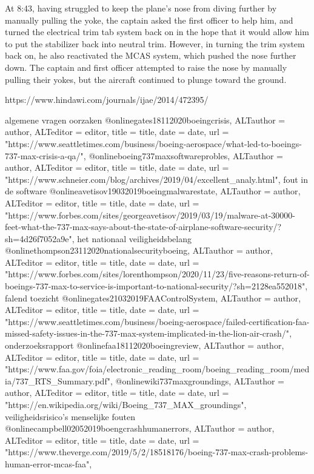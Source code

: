 {{{{{{{{{{{{{{At 8:43, having struggled to keep the plane's nose from diving further by manually pulling the yoke, the captain asked the first officer to help him, and turned the electrical trim tab system back on in the hope that it would allow him to put the stabilizer back into neutral trim. However, in turning the trim system back on, he also reactivated the MCAS system, which pushed the nose further down. The captain and first officer attempted to raise the nose by manually pulling their yokes, but the aircraft continued to plunge toward the ground.

https://www.hindawi.com/journals/ijae/2014/472395/ 
\cite{caliskan09112013747boeingkalman}

algemene vragen
oorzaken
@online{gates18112020boeingcrisis,	ALTauthor = {author},	ALTeditor = {editor},	title = {title},	date = {date},	url = {"https://www.seattletimes.com/business/boeing-aerospace/what-led-to-boeings-737-max-crisis-a-qa/"},}
@online{boeing737maxsoftwareprobles,	ALTauthor = {author},	ALTeditor = {editor},	title = {title},	date = {date},	url = {"https://www.schneier.com/blog/archives/2019/04/excellent_analy.html"},}
fout in de software
@online{avetisov19032019boeingmalwarestate,	ALTauthor = {author},	ALTeditor = {editor},	title = {title},	date = {date},	url = {"https://www.forbes.com/sites/georgeavetisov/2019/03/19/malware-at-30000-feet-what-the-737-max-says-about-the-state-of-airplane-software-security/?sh=4d26f7052a9e"},}
het nationaal veiligheidsbelang
@online{thompson23112020nationalsecurityboeing,	ALTauthor = {author},	ALTeditor = {editor},	title = {title},	date = {date},	url = {"https://www.forbes.com/sites/lorenthompson/2020/11/23/five-reasons-return-of-boeings-737-max-to-service-is-important-to-national-security/?sh=2128ea552018"},}
falend toezicht
@online{gates21032019FAAControlSystem,	ALTauthor = {author},	ALTeditor = {editor},	title = {title},	date = {date},	url = {"https://www.seattletimes.com/business/boeing-aerospace/failed-certification-faa-missed-safety-issues-in-the-737-max-system-implicated-in-the-lion-air-crash/"},}
onderzoeksrapport
@online{faa18112020boeingreview,	ALTauthor = {author},	ALTeditor = {editor},	title = {title},	date = {date},	url = {"https://www.faa.gov/foia/electronic_reading_room/boeing_reading_room/media/737_RTS_Summary.pdf"},}
@online{wiki737maxgroundings,	ALTauthor = {author},	ALTeditor = {editor},	title = {title},	date = {date},	url = {"https://en.wikipedia.org/wiki/Boeing_737_MAX_groundings"},}
veiligheidsrisico's
menselijke fouten
@online{campbell02052019boengcrashhumanerrors,	ALTauthor = {author},	ALTeditor = {editor},	title = {title},	date = {date},	url = {"https://www.theverge.com/2019/5/2/18518176/boeing-737-max-crash-problems-human-error-mcas-faa"},}
}}}}}}}}}}}}}}
